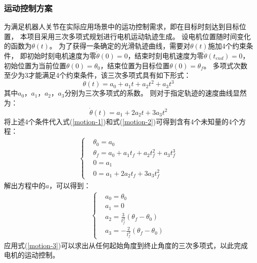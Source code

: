 ﻿\documentclass[12pt,a4paper]{article}
\begin{document}
\subsubsection{运动控制方案}
为满足机器人关节在实际应用场景中的运功控制需求，即在目标时刻达到目标位置，
本项目采用三次多项式规划进行电机运动轨迹生成。
设电机位置随时间变化的函数为$\theta(t)$。
为了获得一条确定的光滑轨迹曲线，需要对$\theta(t)$施加4个约束条件，
即初始时刻电机速度为零$\dot{\theta}(0) = 0$，结束时刻电机速度为零$\dot{\theta}(t_{end}) = 0$，
初始位置为当前位置$\theta(0) = \theta_0$，结束位置为目标位置$\theta(0) = \theta_f$。
多项式次数至少为3才能满足4个约束条件，该三次多项式具有如下形式：
\begin{equation}
  \label{motion-1}
  \theta(t)=a_0+a_1t+a_2t^2+a_3t^3
\end{equation}
其中$a_0$，$a_1$，$a_2$，$a_3$分别为三次多项式的系数。
则对于指定轨迹的速度曲线显然为：
\begin{equation}
  \label{motion-2}
  \dot{\theta}(t)=a_1+2a_2t+3a_3t^2
\end{equation}
将上述4个条件代入式(\ref{motion-1})和式(\ref{motion-2})可得到含有4个未知量的4个方程：
\begin{align}
  \left\{
  \begin{aligned}
     & \theta_0=a_0                          \\
     & \theta_f=a_0+a_1t_f+a_2t_f^2+a_3t_f^3 \\
     & 0 = a_1                               \\
     & 0 = a_1+2a_2t_f+3a_3t_f^2
  \end{aligned}
  \right.
\end{align}
解出方程中的$a$，可以得到：
\begin{align}
  \label{motion-3}
  \left\{
  \begin{aligned}
     & a_0 = \theta_0                            \\
     & a_1=0                                     \\
     & a_2 = \frac{3}{t_f^2}(\theta_f-\theta_0)  \\
     & a_3 = -\frac{2}{t_f^3}(\theta_f-\theta_0)
  \end{aligned}
  \right.
\end{align}
应用式(\ref{motion-3})可以求出从任何起始角度到终止角度的三次多项式，以此完成电机的运动控制。

\newpage
\end{document}
